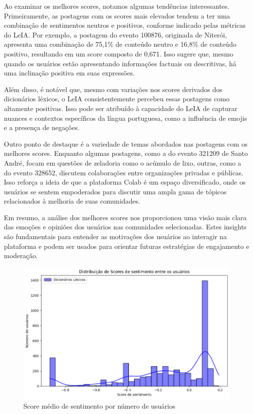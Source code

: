 Ao examinar os melhores scores, notamos algumas tendências interessantes. Primeiramente, as postagens com os scores mais elevados tendem a ter uma combinação de sentimentos neutros e positivos, conforme indicado pelas métricas do LeIA. Por exemplo, a postagem do evento 100876, originada de Niterói, apresenta uma combinação de 75,1\% de conteúdo neutro e 16,8\% de conteúdo positivo, resultando em um score composto de 0,671. Isso sugere que, mesmo quando os usuários estão apresentando informações factuais ou descritivas, há uma inclinação positiva em suas expressões.

Além disso, é notável que, mesmo com variações nos scores derivados dos dicionários léxicos, o LeIA consistentemente percebeu essas postagens como altamente positivas. Isso pode ser atribuído à capacidade do LeIA de capturar nuances e contextos específicos da língua portuguesa, como a influência de emojis e a presença de negações.

Outro ponto de destaque é a variedade de temas abordados nas postagens com os melhores scores. Enquanto algumas postagens, como a do evento 321209 de Santo André, focam em questões de zeladoria como o acúmulo de lixo, outras, como a do evento 328652, discutem colaborações entre organizações privadas e públicas. Isso reforça a ideia de que a plataforma Colab é um espaço diversificado, onde os usuários se sentem empoderados para discutir uma ampla gama de tópicos relacionados à melhoria de suas comunidades.

Em resumo, a análise dos melhores scores nos proporcionou uma visão mais clara das emoções e opiniões dos usuários nas comunidades selecionadas. Estes insights são fundamentais para entender as motivações dos usuários ao interagir na plataforma e podem ser usados para orientar futuras estratégias de engajamento e moderação.

\begin{figure}[!htb]
	\caption{Score médio de sentimento por número de usuários}
	\label{fig:average_score_by_number_of_users}
	\centering
	\includegraphics[scale=0.70]{images/average_score_by_number_of_users.png}
	\fautor
\end{figure}

